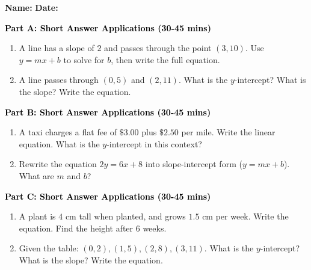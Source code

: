 \documentclass[12pt, letterpaper, fleqn]{article}
\begin{document}
\textbf{Name:} \underline{\hspace{5cm}}
\hfill
\textbf{Date:} \underline{\hspace{3cm}}\\


\begin{tcolorbox}[colback=customteal!20]
\large\textcolor{black}{\textbf{Part A: Short Answer Applications (30-45 mins)}}
\end{tcolorbox}

\vspace{3mm}

\begin{enumerate}[itemsep=4.2cm, leftmargin=0.6cm]
\item A line has a slope of $2$ and passes through the point $(3, 10)$. Use $y = mx + b$ to solve for $b$, then write the full equation.
\item A line passes through $(0, 5)$ and $(2, 11)$. What is the $y$-intercept? What is the slope? Write the equation.
\end{enumerate}

\newpage

\begin{tcolorbox}[colback=customteal!20]
\large\textcolor{black}{\textbf{Part B: Short Answer Applications (30-45 mins)}}
\end{tcolorbox}

\vspace{3mm}

\begin{enumerate}[itemsep=4.2cm, leftmargin=0.6cm, resume]
\item A taxi charges a flat fee of $\$3.00$ plus $\$2.50$ per mile. Write the linear equation. What is the $y$-intercept in this context?
\item Rewrite the equation $2y = 6x + 8$ into slope-intercept form ($y=mx+b$). What are $m$ and $b$?
\end{enumerate}

\newpage

\begin{tcolorbox}[colback=customteal!20]
\large\textcolor{black}{\textbf{Part C: Short Answer Applications (30-45 mins)}}
\end{tcolorbox}

\vspace{3mm}

\begin{enumerate}[itemsep=4.2cm, leftmargin=0.6cm, resume]
\item A plant is $4\text{ cm}$ tall when planted, and grows $1.5\text{ cm}$ per week. Write the equation. Find the height after 6 weeks.
\item Given the table: $(0, 2), (1, 5), (2, 8), (3, 11)$. What is the $y$-intercept? What is the slope? Write the equation.
\end{enumerate}
\end{document}
